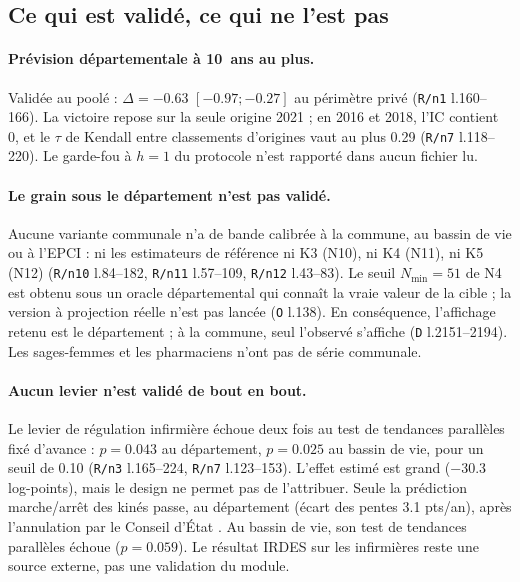 \subsection{Ce qui est validé, ce qui ne l'est pas}\label{val:perimetre}

\paragraph{Prévision départementale à 10~ans au plus.} Validée au poolé : $\Delta = \num{-0.63}$
$[\num{-0.97} ; \num{-0.27}]$\mesure{} au périmètre privé (\texttt{R/n1} l.160--166). La victoire
repose sur la seule origine 2021 ; en 2016 et 2018, l'IC contient 0\mesure, et le $\tau$ de Kendall
entre classements d'origines vaut au plus \num{0.29}\mesure{} (\texttt{R/n7} l.118--220). Le
garde-fou à $h = 1$ du protocole n'est rapporté dans aucun fichier lu.

\paragraph{Le grain sous le département n'est pas validé.} Aucune variante communale n'a de bande
calibrée à la commune, au bassin de vie ou à l'EPCI : ni les estimateurs de référence ni K3
(N10), ni K4 (N11), ni K5 (N12) (\texttt{R/n10} l.84--182, \texttt{R/n11} l.57--109,
\texttt{R/n12} l.43--83). Le seuil $N_{\min} = 51$\mesure{} de N4 est obtenu sous un oracle
départemental qui connaît la vraie valeur de la cible ; la version à projection réelle n'est pas
lancée (\texttt{O} l.138). En conséquence, l'affichage retenu est le département ; à la commune,
seul l'observé s'affiche (\texttt{D} l.2151--2194). Les sages-femmes et les pharmaciens n'ont pas
de série communale.

\paragraph{Aucun levier n'est validé de bout en bout.} Le levier de régulation infirmière échoue
deux fois au test de tendances parallèles fixé d'avance : $p = \num{0.043}$\mesure{} au
département, $p = \num{0.025}$\mesure{} au bassin de vie, pour un seuil de \num{0.10}\suppose{}
(\texttt{R/n3} l.165--224, \texttt{R/n7} l.123--153). L'effet estimé est grand
(\num{-30.3}\mesure{} log-points), mais le design ne permet pas de l'attribuer. Seule la prédiction
marche/arrêt des kinés passe, au département (écart des pentes \num{+3.1}\mesure{} pts/an), après
l'annulation par le Conseil d'État \citep{ce2014mk}. Au bassin de vie, son test de tendances
parallèles échoue ($p = \num{0.059}$\mesure). Le résultat IRDES sur les infirmières
\citep{irdes270} reste une source externe, pas une validation du module.

